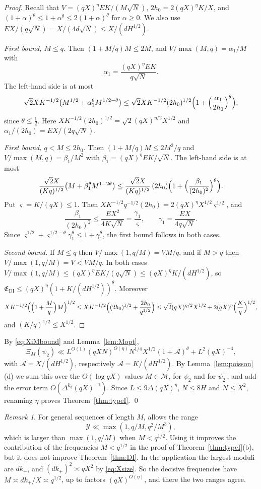 \documentclass[11pt]{amsart}
\theoremstyle{remark}
\newtheorem{remark}[theorem]{Remark}
\theoremstyle{definition}
\numberwithin{equation}{section}
\newcommand{\Mset}{\mathcal{M}}
\begin{document}
\begin{proof}
Recall that $V=(qX)^\eta EK/(M\sqrt N)$, $2h_0=2(qX)^\eta K/X$, and $(1+\alpha)^\theta\le1+\alpha^\theta\le2(1+\alpha)^\theta$ for $\alpha\ge0$. We also use $EX/(q\sqrt N)=X/(4d\sqrt N)\le X/(dH^{1/2})$.

\emph{First bound, $M\le q$.} Then $(1+M/q)M\le2M$, and $V/\max(M,q)=\alpha_1/M$ with
\[
\alpha_1=\frac{(qX)^\eta EK}{q\sqrt N}.
\]
The left-hand side is at most
\[
\sqrt2XK^{-1/2}\bigl(M^{1/2}+\alpha_1^\theta M^{1/2-\theta}\bigr)\le\sqrt2XK^{-1/2}(2h_0)^{1/2}\Bigl(1+\Bigl(\frac{\alpha_1}{2h_0}\Bigr)^\theta\Bigr),
\]
since $\theta\le\frac12$. Here $XK^{-1/2}(2h_0)^{1/2}=\sqrt2(qX)^{\eta/2}X^{1/2}$ and $\alpha_1/(2h_0)=EX/(2q\sqrt N)$.

\emph{First bound, $q<M\le2h_0$.} Then $(1+M/q)M\le2M^2/q$ and $V/\max(M,q)=\beta_1/M^2$ with $\beta_1=(qX)^\eta EK/\sqrt N$. The left-hand side is at most
\[
\frac{\sqrt2X}{(Kq)^{1/2}}\bigl(M+\beta_1^\theta M^{1-2\theta}\bigr)\le\frac{\sqrt2X}{(Kq)^{1/2}}\,(2h_0)\Bigl(1+\Bigl(\frac{\beta_1}{(2h_0)^2}\Bigr)^\theta\Bigr).
\]
Put $\varsigma=K/(qX)\le1$. Then $XK^{-1/2}q^{-1/2}(2h_0)=2(qX)^\eta X^{1/2}\varsigma^{1/2}$, and
\[
\frac{\beta_1}{(2h_0)^2}\le\frac{EX^2}{4K\sqrt N}=\frac{\gamma_1}{\varsigma},\qquad\gamma_1=\frac{EX}{4q\sqrt N}.
\]
Since $\varsigma^{1/2}+\varsigma^{1/2-\theta}\gamma_1^\theta\le1+\gamma_1^\theta$, the first bound follows in both cases.

\emph{Second bound.} If $M\le q$ then $V/\max(1,q/M)=VM/q$, and if $M>q$ then $V/\max(1,q/M)=V<VM/q$. In both cases $V/\max(1,q/M)\le(qX)^\eta EK/(q\sqrt N)\le(qX)^\eta K/(dH^{1/2})$, so $\mathfrak E_{\mathrm{DI}}\le(qX)^{\eta}(1+K/(dH^{1/2}))^\theta$. Moreover
\[
XK^{-1/2}\Bigl(\Bigl(1+\frac Mq\Bigr)M\Bigr)^{1/2}\le XK^{-1/2}\Bigl((2h_0)^{1/2}+\frac{2h_0}{q^{1/2}}\Bigr)\le\sqrt2(qX)^{\eta/2}X^{1/2}+2(qX)^\eta\Bigl(\frac Kq\Bigr)^{1/2},
\]
and $(K/q)^{1/2}\le X^{1/2}$.
\end{proof}

By \eqref{eq:XiMbound} and Lemma~\ref{lem:Mopt},
\[
\Xi_M(\psi_2)\ll L^{O(1)}(qXN)^{O(\eta)}N^{1/4}X^{1/2}(1+\mathcal A)^\theta+L^2(qX)^{-4},
\]
with $\mathcal A=X/(dH^{1/2})$, respectively $\mathcal A=K/(dH^{1/2})$. By Lemma~\ref{lem:poisson}(d) we sum this over the $O(\log qX)$ values $M\in\Mset$, for $\psi_2$ and for $\psi_2^-$, and add the error term $O(\Delta^{k_\eta}(qX)^{-1})$. Since $L\le9\Delta(qX)^\eta$, $N\le8H$ and $N\le X^2$, renaming $\eta$ proves Theorem~\ref{thm:typeI}. \qed

\begin{remark}\label{rem:q2N3}
For general sequences of length $M$, \cite[Theorem~A]{Pas} allows the range
\[
\mathcal Y\ll\max(1,q/M,q^2/M^3),
\]
which is larger than $\max(1,q/M)$ when $M<q^{1/2}$. Using it improves the contribution of the frequencies $M<q^{1/2}$ in the proof of Theorem~\ref{thm:typeI}(b), but it does not improve Theorem~\ref{thm:DI}. In the application the largest moduli are $dk_+$, and $(dk_+)^2\asymp qX^2$ by \eqref{eq:Xsize}. So the decisive frequencies have $M\asymp dk_+/X\asymp q^{1/2}$, up to factors $(qX)^{O(\eta)}$, and there the two ranges agree.
\end{remark}
\end{document}
